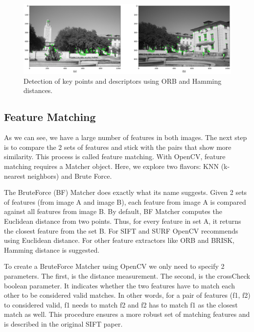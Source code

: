 \documentclass[10pt,twocolumn,letterpaper]{article}
\begin{document}
\begin{figure}[h!]
\begin{center}
	\includegraphics[width=0.99\columnwidth]{pics/orb_features_img_1.jpeg}
	\caption{Detection of key points and descriptors using ORB and Hamming distances. \label{fig:orb-features}}   
\end{center} 
\end{figure}  

\subsection{Feature Matching}

As we can see, we have a large number of features in both images. The next step is to compare the 2 sets of features and stick with the pairs that show more similarity. This process is called feature matching.
With OpenCV, feature matching requires a Matcher object. Here, we explore two flavors: KNN (k-nearest neighbors) and Brute Force.

The BruteForce (BF) Matcher does exactly what its name suggests. Given 2 sets of features (from image A and image B), each feature from image A is compared against all features from image B. By default, BF Matcher computes the Euclidean distance from two points. Thus, for every feature in set A, it returns the closest feature from the set B. For SIFT and SURF OpenCV recommends using Euclidean distance. For other feature extractors like ORB and BRISK, Hamming distance is suggested.

To create a BruteForce Matcher using OpenCV we only need to specify 2 parameters. The first, is the distance measurement. The second, is the crossCheck boolean parameter. It indicates whether the two features have to match each other to be considered valid matches. In other words, for a pair of features (f1, f2) to considered valid, f1 needs to match f2 and f2 has to match f1 as the closest match as well. This procedure ensures a more robust set of matching features and is described in the original SIFT paper.
\end{document}

